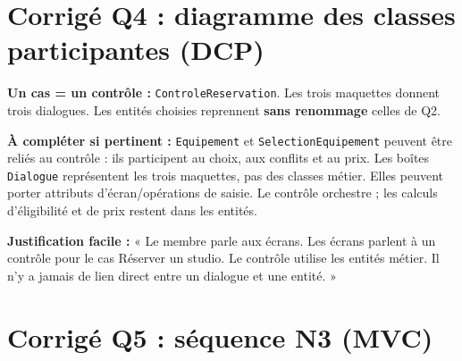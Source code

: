\documentclass[10pt,a4paper]{article}
\begin{document}
\section{Corrigé Q4 : diagramme des classes participantes (DCP)}
\textbf{Un cas = un contrôle :} \texttt{ControleReservation}. Les trois maquettes donnent trois dialogues. Les entités choisies reprennent \textbf{sans renommage} celles de Q2.
\begin{center}
\end{center}
\textbf{À compléter si pertinent :} \texttt{Equipement} et \texttt{SelectionEquipement} peuvent être reliés au contrôle : ils participent au choix, aux conflits et au prix. Les boîtes \texttt{Dialogue} représentent les trois maquettes, pas des classes métier. Elles peuvent porter attributs d'écran/opérations de saisie. Le contrôle orchestre ; les calculs d'éligibilité et de prix restent dans les entités.
\begin{answerbox}
\textbf{Justification facile :} « Le membre parle aux écrans. Les écrans parlent à un contrôle pour le cas Réserver un studio. Le contrôle utilise les entités métier. Il n'y a jamais de lien direct entre un dialogue et une entité. »
\end{answerbox}

\section{Corrigé Q5 : séquence N3 (MVC)}
\end{document}
